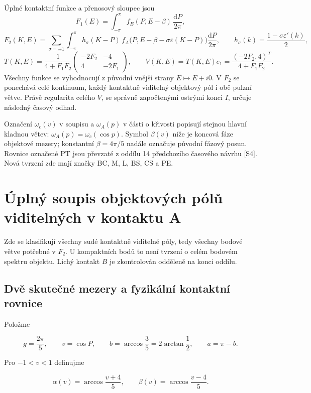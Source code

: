 \documentclass[11pt,a4paper]{article}
\theoremstyle{remark}\newtheorem{remark}[theorem]{Poznámka}
\numberwithin{equation}{section}
\begin{document}
Úplné kontaktní funkce a přenosový sloupec jsou
\[
F_1(E)=\int_{-\pi}^{\pi}
f_B(P,E-\beta)\,\frac{\mathrm dP}{2\pi},
\]
\[
F_2(K,E)=\sum_{\sigma=\pm1}\int_{-\pi}^{\pi}
h_\sigma(K-P)\,
f_A\bigl(P,E-\beta-\sigma\varepsilon(K-P)\bigr)
\frac{\mathrm dP}{2\pi},
\qquad h_\sigma(k)=\frac{1-\sigma\varepsilon'(k)}2,
\]
\[
T(K,E)=\frac{1}{4+F_1F_2}
\begin{pmatrix}-2F_2&-4\\4&-2F_1\end{pmatrix},
\qquad
V(K,E)=T(K,E)e_1=\frac{(-2F_2,4)^T}{4+F_1F_2}.
\]
Všechny funkce se vyhodnocují z původní vnější strany
\(E\mapsto E+i0\). V \(F_2\) se ponechává celé kontinuum,
každý kontaktně viditelný objektový pól i obě pulzní větve.
Právě regularita celého \(V\), se správně započtenými ostrými
konci \(I\), určuje následný časový odhad.

Označení \(\omega_c(v)\) v soupisu a \(\omega_A(p)\) v části
o křivosti popisují stejnou hlavní kladnou větev:
\(\omega_A(p)=\omega_c(\cos p)\).
Symbol \(\beta(v)\) níže je koncová fáze objektové mezery;
konstantní \(\beta=4\pi/5\) nadále označuje původní fázový posun.
Rovnice označené PT jsou převzaté z oddílu 14 předchozího
časového návrhu [S4]. Nová tvrzení zde mají značky
BC, M, L, BS, CS a PE.

\section{Úplný soupis objektových pólů viditelných v kontaktu A}
Zde se klasifikují všechny sudé kontaktně viditelné póly, tedy všechny bodové větve potřebné v \(F_2\). U kompaktních bodů to není tvrzení o celém bodovém spektru objektu. Lichý kontakt \(B\) je zkontrolován odděleně na konci oddílu.

\hypertarget{dvux11b-skuteux10dnuxe9-mezery-a-fyzikuxe1lnuxed-kontaktnuxed-rovnice}{%
\subsection{Dvě skutečné mezery a fyzikální kontaktní
rovnice}\label{dvux11b-skuteux10dnuxe9-mezery-a-fyzikuxe1lnuxed-kontaktnuxed-rovnice}}

Položme

\[
g=\frac{2\pi}{5},\qquad v=\cos P,\qquad
b=\arccos\frac35=2\arctan\frac12,\qquad a=\pi-b.
\tag{BC1}
\]

Pro \(-1<v<1\) definujme

\[
\alpha(v)=\arccos\frac{v+4}{5},\qquad
\beta(v)=\arccos\frac{v-4}{5}.
\tag{BC2}
\]
\end{document}
